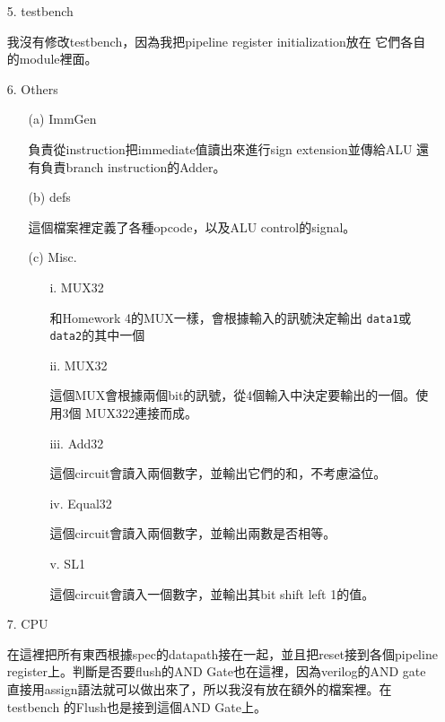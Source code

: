 \documentclass{article}
\begin{document}
\begin{enumerate}
    \item[5.] testbench

        我沒有修改testbench，因為我把pipeline register initialization放在
        它們各自的module裡面。

    \item[6.] Others

        \begin{enumerate}
            \item[(a)] Imm\textunderscore Gen

                負責從instruction把immediate值讀出來進行sign extension並傳給ALU
                還有負責branch instruction的Adder。

            \item[(b)] defs

                這個檔案裡定義了各種opcode，以及ALU control的signal。

                \pagebreak

            \item[(c)] Misc.

                \begin{enumerate}
                    \item[i.] MUX32

                        和Homework 4的MUX一樣，會根據輸入的訊號決定輸出
                        \texttt{data1}或\texttt{data2}的其中一個

                    \item[ii.] MUX32

                        這個MUX會根據兩個bit的訊號，從4個輸入中決定要輸出的一個。使用3個
                        MUX32\textunderscore 2連接而成。

                    \item[iii.] Add32

                        這個circuit會讀入兩個數字，並輸出它們的和，不考慮溢位。

                    \item[iv.] Equal32

                        這個circuit會讀入兩個數字，並輸出兩數是否相等。

                    \item[v.] SL1

                        這個circuit會讀入一個數字，並輸出其bit shift left 1的值。

                \end{enumerate}
        \end{enumerate}

    \item[7.] CPU

        在這裡把所有東西根據spec的datapath接在一起，並且把reset接到各個pipeline
        register上。判斷是否要flush的AND Gate也在這裡，因為verilog的AND gate
        直接用assign語法就可以做出來了，所以我沒有放在額外的檔案裡。在testbench
        的Flush也是接到這個AND Gate上。
\end{enumerate}
\end{document}
